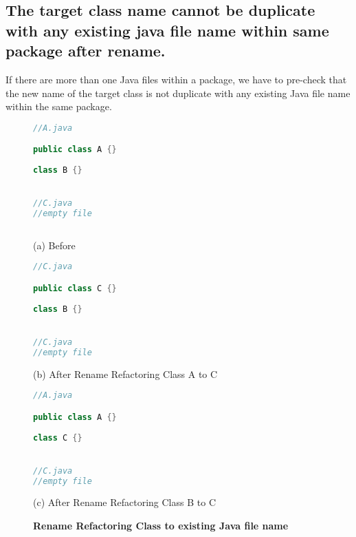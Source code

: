 \subsection{The target class name cannot be duplicate with any existing java file name within same package after rename.}

If there are more than one Java files within a package, we have to pre-check that the new name of the target class is not duplicate with any existing Java file name within the same package. 

\begin{figure}[th]
\centering
\begin{minipage}[t]{0.45\linewidth}
\begin{lstlisting}[language=java, basicstyle=\scriptsize\ttfamily,frame=single]
//A.java

public class A {}
	
class B {}


//C.java
//empty file
 
\end{lstlisting}
\centering(a) Before 
\end{minipage}
\hfill
\begin{minipage}[t]{0.45\linewidth}
\begin{lstlisting}[language=java, basicstyle=\scriptsize\ttfamily,frame=single]
//C.java

public class C {}
	
class B {}


//C.java
//empty file

\end{lstlisting}
\centering(b) After Rename Refactoring Class A to C
\end{minipage}

\centering
\begin{minipage}[t]{0.45\linewidth}
\begin{lstlisting}[language=java, basicstyle=\scriptsize\ttfamily,frame=single]
//A.java

public class A {}
	
class C {}


//C.java
//empty file

\end{lstlisting}
\centering(c) After Rename Refactoring Class B to C
\end{minipage}
\caption{\textbf{Rename Refactoring Class to existing Java file name}}
\label{figure:classFileName}
\end{figure}

